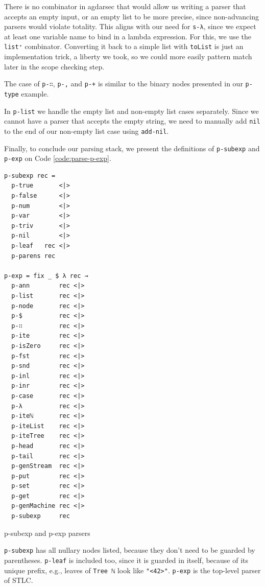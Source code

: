 There is no combinator in agdarsec that would allow us writing a parser that accepts an empty input, or an empty list to be more precise, since non-advancing parsers would violate totality. This aligns with our need for \verb$s-λ$, since we expect at least one variable name to bind in a lambda expression. For this, we use the \verb$list⁺$ combinator. Converting it back to a simple list with \verb$toList$ is just an implementation trick, a liberty we took, so we could more easily pattern match later in the scope checking step.

The case of \verb$p-∷$, \verb$p-,$ and \verb$p-+$ is similar to the binary nodes presented in our \verb$p-type$ example.

In \verb$p-list$ we handle the empty list and non-empty list cases separately. Since we cannot have a parser that accepts the empty string, we need to manually add \verb$nil$ to the end of our non-empty list case using \verb$add-nil$.

Finally, to conclude our parsing stack, we present the definitions of \verb$p-subexp$ and \verb$p-exp$ on Code \ref{code:parse-p-exp}.

\begin{listing}[H]
\begin{verbatim}
p-subexp rec =
  p-true       <|>
  p-false      <|>
  p-num        <|>
  p-var        <|>
  p-triv       <|>
  p-nil        <|>
  p-leaf   rec <|>
  p-parens rec

p-exp = fix _ $ λ rec →
  p-ann        rec <|>
  p-list       rec <|>
  p-node       rec <|>
  p-$          rec <|>
  p-∷          rec <|>
  p-ite        rec <|>
  p-isZero     rec <|>
  p-fst        rec <|>
  p-snd        rec <|>
  p-inl        rec <|>
  p-inr        rec <|>
  p-case       rec <|>
  p-λ          rec <|>
  p-iteℕ       rec <|>
  p-iteList    rec <|>
  p-iteTree    rec <|>
  p-head       rec <|>
  p-tail       rec <|>
  p-genStream  rec <|>
  p-put        rec <|>
  p-set        rec <|>
  p-get        rec <|>
  p-genMachine rec <|>
  p-subexp     rec
\end{verbatim}
\caption{p-subexp and p-exp parsers}
\label{code:parse-p-exp}
\end{listing}

\verb$p-subexp$ has all nullary nodes listed, because they don't need to be guarded by parentheses. \verb$p-leaf$ is included too, since it is guarded in itself, because of its unique prefix, e.g., leaves of \verb$Tree ℕ$ look like \verb$"<42>"$. \verb$p-exp$ is the top-level parser of STLC.

